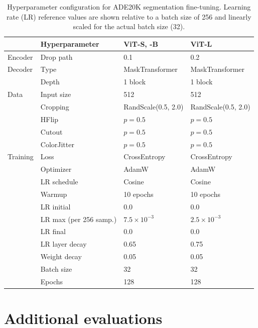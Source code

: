 \begin{table}[tbh]
\centering
\caption{%
Hyperparameter configuration for ADE20K segmentation fine-tuning.
Learning rate (LR) reference values are shown relative to a batch size of 256 and linearly scaled for the actual batch size (32).
}
\label{tab:hparams-ade20k-ft}
\small
\begin{tabular}{@{}llll@{}}
\toprule
          & Hyperparameter      & ViT-S, -B & ViT-L \\
\midrule
Encoder   & Drop path           & 0.1   & 0.2 \\
Decoder   & Type                & MaskTransformer & MaskTransformer \\
          & Depth               & 1 block & 1 block \\
Data      & Input size          & 512   & 512 \\
          & Cropping            & RandScale(0.5, 2.0) & RandScale(0.5, 2.0) \\
          & HFlip               & $p\!=\!0.5$ & $p\!=\!0.5$ \\
          & Cutout              & $p\!=\!0.5$ & $p\!=\!0.5$ \\
          & ColorJitter         & $p\!=\!0.5$ & $p\!=\!0.5$ \\
Training  & Loss                & CrossEntropy    & CrossEntropy \\
          & Optimizer           & AdamW & AdamW \\
          & LR schedule         & Cosine & Cosine \\
          & Warmup              & 10 epochs & 10 epochs \\
          & LR initial          & 0.0   & 0.0 \\
          & LR max (per 256 samp.) & $7.5{\times}10^{-3}$ & $2.5{\times}10^{-3}$ \\
          & LR final            & 0.0   & 0.0 \\
          & LR layer decay      & 0.65  & 0.75 \\
          & Weight decay        & 0.05  & 0.05 \\
          & Batch size          & 32    & 32 \\
          & Epochs              & 128   & 128 \\
\bottomrule
\end{tabular}
\end{table}


\FloatBarrier
\section{Additional evaluations}
\label{a:extra-evals}

